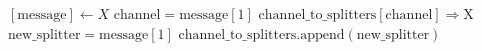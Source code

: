 \documentclass{article}
\begin{document}
\pagestyle{empty}

\newcommand{\send}{\Rightarrow}
\newcommand{\sendto}{\rightarrow}
\newcommand{\recv}{\Leftarrow}
\algrenewcommand\textproc{\textrm}

\begin{algorithmic}

  \algrenewcommand{}
  
  \algrenewcommand{}
  \State $[\text{message}] \gets X$
  \State $\text{channel} = \text{message}[1]$
  \State $\text{channel\_to\_splitters}[\text{channel}] \send \text{X}$
  \Else {}
  \State $\text{new\_splitter} = \text{message}[1]$
  \State $\text{channel\_to\_splitters}.\text{append}(\text{new\_splitter})$
  \EndIf
  \EndIf
  \EndWhile
  \EndProcedure

  \EndProcedure
\end{algorithmic}
\end{document}

